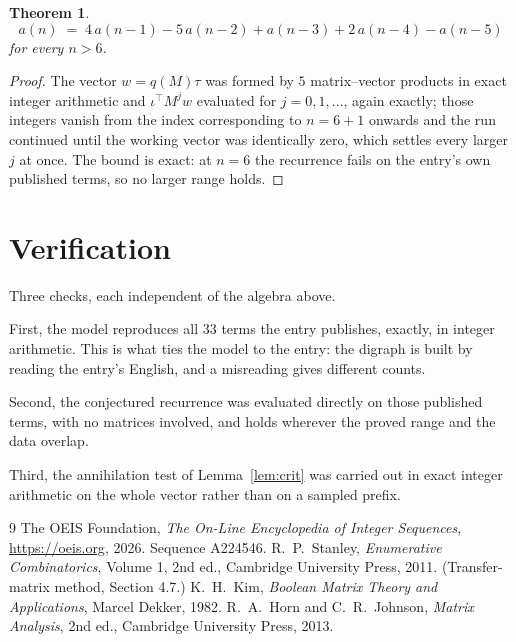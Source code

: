 \documentclass[11pt,a4paper]{article}
\theoremstyle{plain}
\newtheorem{theorem}{Theorem}
\theoremstyle{definition}
\begin{document}
\begin{theorem}
\[
a(n)\;=\;4\,a(n-1) - 5\,a(n-2) + a(n-3) + 2\,a(n-4) - a(n-5)
\]
for every $n>6$.
\end{theorem}

\begin{proof}
The vector $w=q(M)\tau$ was formed by $5$ matrix--vector products in exact integer
arithmetic and $\iota^{\!\top}M^{j}w$ evaluated for $j=0,1,\dots$, again exactly; those
integers vanish from the index corresponding to $n=6+1$ onwards and the run continued
until the working vector was identically zero, which settles every larger $j$ at once. The bound is exact: at $n=6$ the recurrence fails on the entry's own published terms, so no larger range holds.
\end{proof}

\section{Verification}

Three checks, each independent of the algebra above.

First, the model reproduces all $33$ terms the entry publishes, exactly, in integer
arithmetic. This is what ties the model to the entry: the digraph is built by reading the
entry's English, and a misreading gives different counts.

Second, the conjectured recurrence was evaluated directly on those published terms, with no
matrices involved, and holds wherever the proved range and the data overlap.

Third, the annihilation test of Lemma~\ref{lem:crit} was carried out in exact integer
arithmetic on the whole vector rather than on a sampled prefix.

\begin{thebibliography}{9}
 The OEIS Foundation, \emph{The On-Line Encyclopedia of Integer
Sequences}, \url{https://oeis.org}, 2026. Sequence A224546.
 R.~P.~Stanley, \emph{Enumerative Combinatorics}, Volume 1, 2nd ed.,
Cambridge University Press, 2011. (Transfer-matrix method, Section 4.7.)
 K.~H.~Kim, \emph{Boolean Matrix Theory and Applications}, Marcel Dekker,
1982.
 R.~A.~Horn and C.~R.~Johnson, \emph{Matrix Analysis}, 2nd ed., Cambridge
University Press, 2013.
\end{thebibliography}
\end{document}
